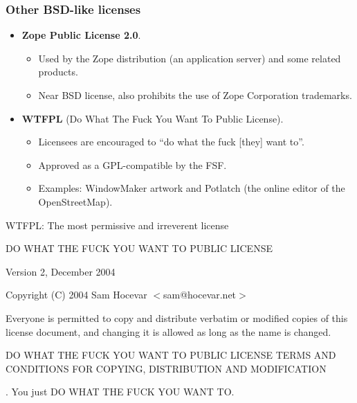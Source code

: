 \begin{frame}
\frametitle{Other BSD-like licenses}

\begin{itemize}
\item {\bf Zope Public License 2.0}. 
	\begin{itemize}
	\item Used by the Zope distribution (an application server) and some related products. 
	\item Near BSD license, also prohibits the use of Zope Corporation trademarks.
	\end{itemize}
\item {\bf WTFPL} (Do What The Fuck You Want To Public License). 
	\begin{itemize}
	\item Licensees are encouraged to ``do what the fuck [they] want to''. 
	\item Approved as a GPL-compatible by the FSF. 
	\item Examples: WindowMaker artwork and Potlatch (the online editor of the OpenStreetMap).
	\end{itemize}
\end{itemize}

\end{frame}


\begin{frame}

\begin{block}{WTFPL: The most permissive and irreverent license} 

\center DO WHAT THE FUCK YOU WANT TO PUBLIC LICENSE

Version 2, December 2004

\flushleft

Copyright (C) 2004 Sam Hocevar $<$sam@hocevar.net$>$

\smallskip

Everyone is permitted to copy and distribute verbatim or modified
copies of this license document, and changing it is allowed as long
as the name is changed.


\center DO WHAT THE FUCK YOU WANT TO PUBLIC LICENSE
  TERMS AND CONDITIONS FOR COPYING, DISTRIBUTION AND MODIFICATION

. You just DO WHAT THE FUCK YOU WANT TO.

\end{block}
\end{frame}



